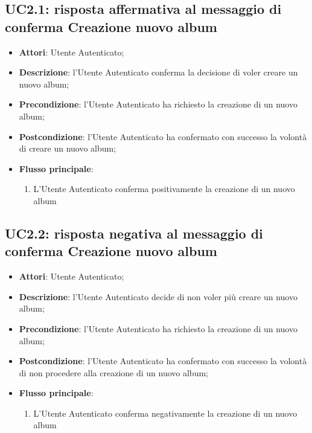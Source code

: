 
\subsection{UC2.1: risposta affermativa al messaggio di conferma Creazione
nuovo album}
\label{uc:uc2.1}
\hypertarget{UC2.1}{}

\begin{itemize}
  \item \textbf{Attori}: Utente Autenticato;
  \item \textbf{Descrizione}: l'Utente Autenticato conferma la decisione di
voler creare un nuovo album;
  \item \textbf{Precondizione}: l'Utente Autenticato ha richiesto la creazione
di un nuovo album;
  \item \textbf{Postcondizione}: l'Utente Autenticato ha confermato con
successo la volontà di creare un nuovo album;
  \item \textbf{Flusso principale}:
  \begin{enumerate}
    \item L'Utente Autenticato conferma positivamente la creazione di un nuovo
album
  \end{enumerate}
\end{itemize}



\subsection{UC2.2: risposta negativa al messaggio di conferma Creazione nuovo
album}
\label{uc:uc2.2}
\hypertarget{UC2.2}{}

\begin{itemize}
  \item \textbf{Attori}: Utente Autenticato;
  \item \textbf{Descrizione}: l'Utente Autenticato decide di non voler più
creare un nuovo album;
  \item \textbf{Precondizione}: l'Utente Autenticato ha richiesto la creazione
di un nuovo album;
  \item \textbf{Postcondizione}: l'Utente Autenticato ha confermato con
successo la volontà di non procedere alla creazione di un nuovo album;
  \item \textbf{Flusso principale}:
  \begin{enumerate}
    \item L'Utente Autenticato conferma negativamente la creazione di un nuovo
album
  \end{enumerate}
\end{itemize}


